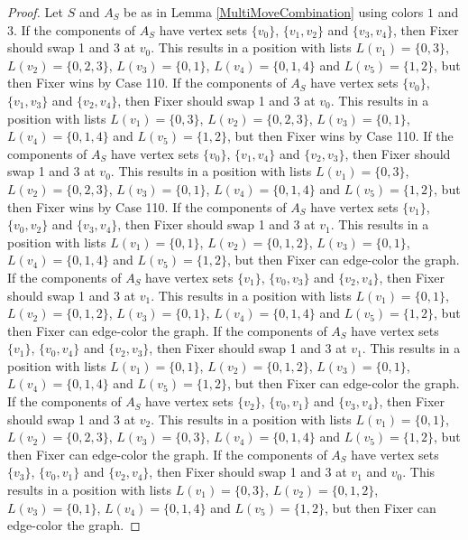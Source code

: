 \documentclass[12pt]{amsart}
\theoremstyle{plain}
\theoremstyle{definition}
\theoremstyle{remark}
\begin{document}
\begin{proof}
Let $S$ and $A_S$ be as in Lemma \ref{MultiMoveCombination} using colors $1$ and $3$. If the components of $A_S$ have vertex sets $\{v_0\}$, $\{v_1, v_2\}$ and $\{v_3, v_4\}$, then Fixer should swap 1 and 3 at $v_0$. This results in a position with lists $L(v_1) = \{0, 3\}$, $L(v_2) = \{0, 2, 3\}$, $L(v_3) = \{0, 1\}$, $L(v_4) = \{0, 1, 4\}$ and $L(v_5) = \{1, 2\}$, but then Fixer wins by Case 110.
If the components of $A_S$ have vertex sets $\{v_0\}$, $\{v_1, v_3\}$ and $\{v_2, v_4\}$, then Fixer should swap 1 and 3 at $v_0$. This results in a position with lists $L(v_1) = \{0, 3\}$, $L(v_2) = \{0, 2, 3\}$, $L(v_3) = \{0, 1\}$, $L(v_4) = \{0, 1, 4\}$ and $L(v_5) = \{1, 2\}$, but then Fixer wins by Case 110.
If the components of $A_S$ have vertex sets $\{v_0\}$, $\{v_1, v_4\}$ and $\{v_2, v_3\}$, then Fixer should swap 1 and 3 at $v_0$. This results in a position with lists $L(v_1) = \{0, 3\}$, $L(v_2) = \{0, 2, 3\}$, $L(v_3) = \{0, 1\}$, $L(v_4) = \{0, 1, 4\}$ and $L(v_5) = \{1, 2\}$, but then Fixer wins by Case 110.
If the components of $A_S$ have vertex sets $\{v_1\}$, $\{v_0, v_2\}$ and $\{v_3, v_4\}$, then Fixer should swap 1 and 3 at $v_1$. This results in a position with lists $L(v_1) = \{0, 1\}$, $L(v_2) = \{0, 1, 2\}$, $L(v_3) = \{0, 1\}$, $L(v_4) = \{0, 1, 4\}$ and $L(v_5) = \{1, 2\}$, but then Fixer can edge-color the graph.
If the components of $A_S$ have vertex sets $\{v_1\}$, $\{v_0, v_3\}$ and $\{v_2, v_4\}$, then Fixer should swap 1 and 3 at $v_1$. This results in a position with lists $L(v_1) = \{0, 1\}$, $L(v_2) = \{0, 1, 2\}$, $L(v_3) = \{0, 1\}$, $L(v_4) = \{0, 1, 4\}$ and $L(v_5) = \{1, 2\}$, but then Fixer can edge-color the graph.
If the components of $A_S$ have vertex sets $\{v_1\}$, $\{v_0, v_4\}$ and $\{v_2, v_3\}$, then Fixer should swap 1 and 3 at $v_1$. This results in a position with lists $L(v_1) = \{0, 1\}$, $L(v_2) = \{0, 1, 2\}$, $L(v_3) = \{0, 1\}$, $L(v_4) = \{0, 1, 4\}$ and $L(v_5) = \{1, 2\}$, but then Fixer can edge-color the graph.
If the components of $A_S$ have vertex sets $\{v_2\}$, $\{v_0, v_1\}$ and $\{v_3, v_4\}$, then Fixer should swap 1 and 3 at $v_2$. This results in a position with lists $L(v_1) = \{0, 1\}$, $L(v_2) = \{0, 2, 3\}$, $L(v_3) = \{0, 3\}$, $L(v_4) = \{0, 1, 4\}$ and $L(v_5) = \{1, 2\}$, but then Fixer can edge-color the graph.
If the components of $A_S$ have vertex sets $\{v_3\}$, $\{v_0, v_1\}$ and $\{v_2, v_4\}$, then Fixer should swap 1 and 3 at $v_1$ and $v_0$. This results in a position with lists $L(v_1) = \{0, 3\}$, $L(v_2) = \{0, 1, 2\}$, $L(v_3) = \{0, 1\}$, $L(v_4) = \{0, 1, 4\}$ and $L(v_5) = \{1, 2\}$, but then Fixer can edge-color the graph.

\end{proof}
\end{document}
